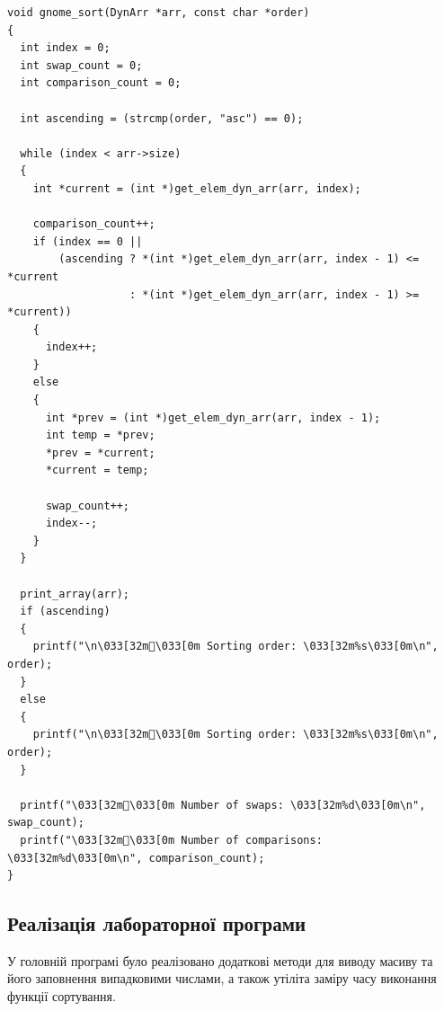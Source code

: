 \begin{lstlisting}[style=customc]
void gnome_sort(DynArr *arr, const char *order)
{
  int index = 0;
  int swap_count = 0;
  int comparison_count = 0;

  int ascending = (strcmp(order, "asc") == 0);

  while (index < arr->size)
  {
    int *current = (int *)get_elem_dyn_arr(arr, index);

    comparison_count++;
    if (index == 0 ||
        (ascending ? *(int *)get_elem_dyn_arr(arr, index - 1) <= *current
                   : *(int *)get_elem_dyn_arr(arr, index - 1) >= *current))
    {
      index++;
    }
    else
    {
      int *prev = (int *)get_elem_dyn_arr(arr, index - 1);
      int temp = *prev;
      *prev = *current;
      *current = temp;

      swap_count++;
      index--;
    }
  }

  print_array(arr);
  if (ascending)
  {
    printf("\n\033[32m\033[0m Sorting order: \033[32m%s\033[0m\n", order);
  }
  else
  {
    printf("\n\033[32m\033[0m Sorting order: \033[32m%s\033[0m\n", order);
  }

  printf("\033[32m󰓡\033[0m Number of swaps: \033[32m%d\033[0m\n", swap_count);
  printf("\033[32m\033[0m Number of comparisons: \033[32m%d\033[0m\n", comparison_count);
}
\end{lstlisting}

\clearpage
\subsection{Реалізація лабораторної програми}
У головній програмі було реалізовано додаткові методи для виводу масиву та його заповнення випадковими числами, а також утіліта заміру часу виконання функції сортування.

